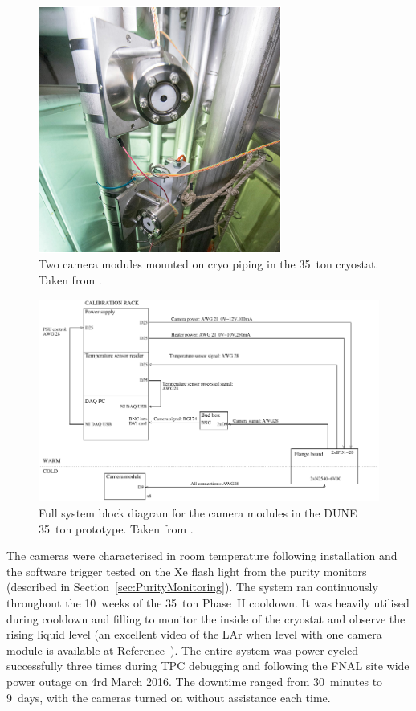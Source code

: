 \begin{figure}
  \centering
  \includegraphics[width=8cm]{35tonCameraMounted.pdf}
  \caption[Two camera modules mounted on cryo piping in the 35~ton cryostat.]{Two camera modules mounted on cryo piping in the 35~ton cryostat.  Taken from \cite{35tonCameras2017}.}
  \label{fig:35tonCameraMounted}
\end{figure}

\begin{figure}
  \centering
  \includegraphics[width=12cm]{35tonCameraDiagram.pdf}
  \caption[Full system block diagram for the camera modules in the DUNE 35~ton prototype.]{Full system block diagram for the camera modules in the DUNE 35~ton prototype.  Taken from \cite{35tonCameras2017}.}
  \label{fig:35tonCameraDiagram}
\end{figure}

The cameras were characterised in room temperature following installation and the software trigger tested on the Xe flash light from the purity monitors (described in Section~\ref{sec:PurityMonitoring}).  The system ran continuously throughout the 10~weeks of the 35~ton Phase~II cooldown.  It was heavily utilised during cooldown and filling to monitor the inside of the cryostat and observe the rising liquid level (an excellent video of the LAr when level with one camera module is available at Reference~\cite{35tonCameraVideo}).  The entire system was power cycled successfully three times during TPC debugging and following the FNAL site wide power outage on 4rd March 2016.  The downtime ranged from 30~minutes to 9~days, with the cameras turned on without assistance each time.

